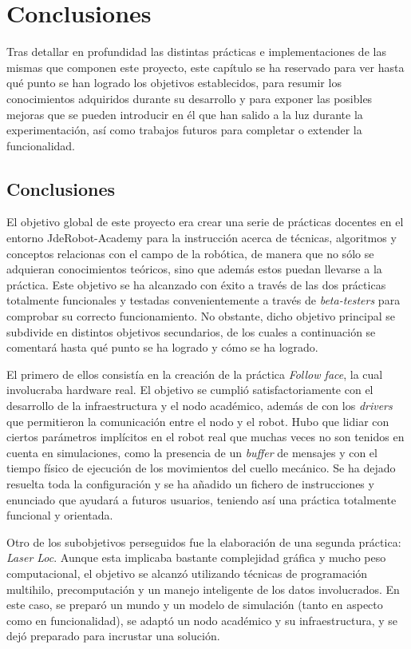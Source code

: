 \chapter{Conclusiones}\label{cap.conclusiones}
Tras detallar en profundidad las distintas prácticas e implementaciones de las mismas que componen este proyecto, este capítulo se ha reservado para ver hasta qué punto se han logrado los objetivos establecidos, para resumir los conocimientos adquiridos durante su desarrollo y para exponer las posibles mejoras que se pueden introducir en él que han salido a la luz durante la experimentación, así como trabajos futuros para completar o extender la funcionalidad.

\section{Conclusiones}
El objetivo global de este proyecto era crear una serie de prácticas docentes en el entorno JdeRobot-Academy para la instrucción acerca de técnicas, algoritmos y conceptos relacionas con el campo de la robótica, de manera que no sólo se adquieran conocimientos teóricos, sino que además estos puedan llevarse a la práctica. Este objetivo se ha alcanzado con éxito a través de las dos prácticas totalmente funcionales y testadas convenientemente a través de \textit{beta-testers} para comprobar su correcto funcionamiento. No obstante, dicho objetivo principal se subdivide en distintos objetivos secundarios, de los cuales a continuación se comentará hasta qué punto se ha logrado y cómo se ha logrado. 

El primero de ellos consistía en la creación de la práctica \textit{Follow face}, la cual  involucraba hardware real. El objetivo se cumplió satisfactoriamente con el desarrollo de la infraestructura y el nodo académico, además de con los \textit{drivers} que permitieron la comunicación entre el nodo y el robot. Hubo que lidiar con ciertos parámetros implícitos en el robot real que muchas veces no son tenidos en cuenta en simulaciones, como la presencia de un \textit{buffer} de mensajes y con el tiempo físico de ejecución de los movimientos del cuello mecánico. Se ha dejado resuelta toda la configuración y se ha añadido un fichero de instrucciones y enunciado que ayudará a futuros usuarios, teniendo así una práctica totalmente funcional y orientada.

Otro de los subobjetivos perseguidos fue la elaboración de una segunda práctica: \textit{Laser Loc}. Aunque esta implicaba bastante complejidad gráfica y mucho peso computacional, el objetivo se alcanzó utilizando técnicas de programación multihilo, precomputación y un manejo inteligente de los datos involucrados. En este caso, se preparó un mundo y un modelo de simulación (tanto en aspecto como en funcionalidad), se adaptó un nodo académico y su infraestructura, y se dejó preparado para incrustar una solución. 

